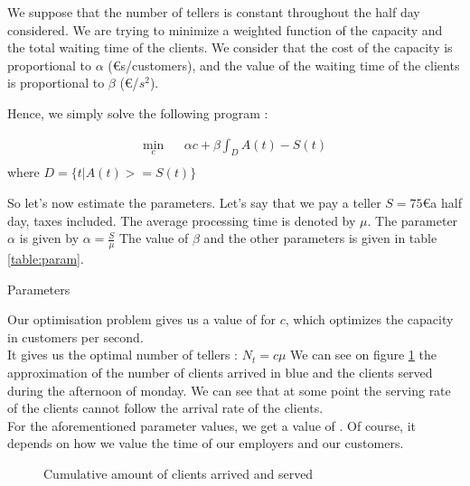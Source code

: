 \documentclass[12pt,a4paper,notitlepage]{report}
\begin{document}
We suppose that the number of tellers is constant throughout the half day considered.
We are trying to minimize a weighted function of the capacity and the total waiting time of the clients.
We consider that the cost of the capacity is proportional to $ \alpha$ (\euro s/customers), and the value of the waiting time of the clients is proportional to $\beta$ (\euro/$s^2$).

Hence, we simply solve the following program :

\begin{eqnarray*}
\min_c & & \alpha c + \beta \int_D A(t)-S(t)\\
\end{eqnarray*}
where $D = \{t | A(t)>=S(t) \}$

So let's now estimate the parameters. Let's say that we pay a teller $S = 75$\euro  a half day, taxes included.
The average processing time is denoted by $\mu$. 
The parameter $\alpha$ is given by $\alpha = \frac{S}{\mu}$
The value of $\beta$ and the other parameters is given in table \ref{table:param}.
\begin{table}

\caption{Parameters\label{table:param}}
\end{table}

Our optimisation problem gives us a value of  for $c$, which optimizes the capacity in customers per second.\\
It gives us the optimal number of tellers : $N_t = c \mu$
We can see on figure \ref{fig:clients_lun} the approximation of the number of clients arrived in blue and the clients served during the afternoon of monday. We can see that at some point the serving rate of the clients cannot follow the arrival rate of the clients. \\
For the aforementioned parameter values, we get a value of . Of course, it depends on how we value the time of our employers and our customers.
\begin{figure}[h]
\centering
{}
\caption{Cumulative amount of clients arrived and served\label{fig:clients_lun}}
\end{figure}
\end{document}
